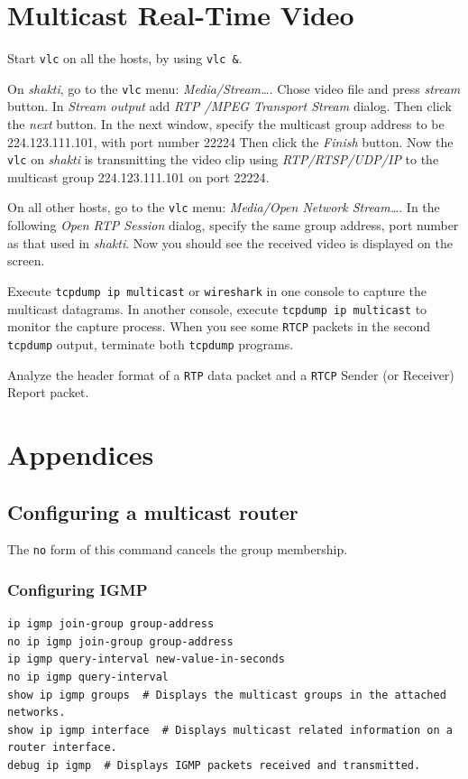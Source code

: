 \documentclass{../UTNetLab}
\begin{document}
\section{Multicast Real-Time Video}
    Start \lstinline{vlc} on all the hosts, by using \lstinline{vlc &}. 

    On \textit{shakti}, go to the \lstinline{vlc} menu: \textit{Media/Stream\ldots }. Chose video file  and press \textit{stream} button. In \textit{Stream output} add \textit{RTP /MPEG Transport Stream} dialog.
    Then click the \textit{next} button.
    In the next window, specify the multicast group address to be {224.123.111.101}, with port number {22224} %
    Then click the \textit{Finish} button.
    Now the \lstinline{vlc} on \textit{shakti} is transmitting the video clip using \textit{RTP/RTSP/UDP/IP} to the multicast group {224.123.111.101} on port {22224}. 

    On all other hosts, go to the \lstinline{vlc} menu: \textit{Media/Open Network Stream\ldots}. In the following \textit{Open RTP Session} dialog, specify the same group address, port number as that used in \textit{shakti}.%
    Now you should see the received video is displayed on the screen. 

    Execute \lstinline{tcpdump ip multicast} or \lstinline{wireshark} in one console to capture the multicast datagrams.
    In another console, execute \lstinline{tcpdump ip multicast} to monitor the capture process.
    When you see some \texttt{RTCP} packets in the second \lstinline{tcpdump} output, terminate both \lstinline{tcpdump} programs. 

    Analyze the header format of a \texttt{RTP} data packet and a \texttt{RTCP} Sender (or Receiver) Report packet.


    \appendix
\section*{Appendices}
\renewcommand{\thesubsection}{\Alph{subsection}}

\subsection{Configuring a multicast router}
The \lstinline[language={cisco}]{no} form of this command cancels the group membership.
\subsubsection{Configuring IGMP}
\begin{lstlisting}[language={cisco}, emph={new-value-in-seconds, }]
ip igmp join-group group-address
no ip igmp join-group group-address
ip igmp query-interval new-value-in-seconds
no ip igmp query-interval
show ip igmp groups  # Displays the multicast groups in the attached networks.
show ip igmp interface  # Displays multicast related information on a router interface.
debug ip igmp  # Displays IGMP packets received and transmitted.
\end{lstlisting}
\end{document}
